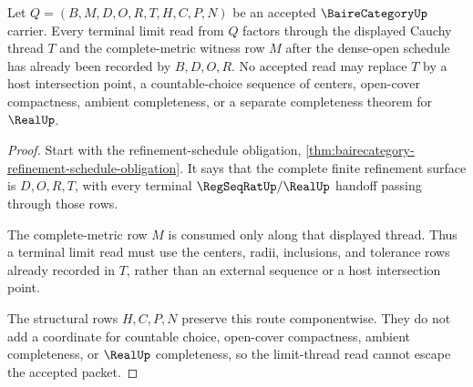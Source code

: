 \begin{theorem}
\label{thm:bairecategory-limit-thread-nonescape}
Let $Q=(B,M,D,O,R,T,H,C,P,N)$ be an accepted $\BaireCategoryUp$ carrier. Every terminal limit read from $Q$ factors through the displayed Cauchy thread $T$ and the complete-metric witness row $M$ after the dense-open schedule has already been recorded by $B,D,O,R$. No accepted read may replace $T$ by a host intersection point, a countable-choice sequence of centers, open-cover compactness, ambient completeness, or a separate completeness theorem for $\RealUp$.
\end{theorem}
\begin{proof}
Start with the refinement-schedule obligation, \autoref{thm:bairecategory-refinement-schedule-obligation}. It says that the complete finite refinement surface is $D,O,R,T$, with every terminal $\RegSeqRatUp/\RealUp$ handoff passing through those rows.

The complete-metric row $M$ is consumed only along that displayed thread. Thus a terminal limit read must use the centers, radii, inclusions, and tolerance rows already recorded in $T$, rather than an external sequence or a host intersection point.

The structural rows $H,C,P,N$ preserve this route componentwise. They do not add a coordinate for countable choice, open-cover compactness, ambient completeness, or $\RealUp$ completeness, so the limit-thread read cannot escape the accepted packet.
\end{proof}

